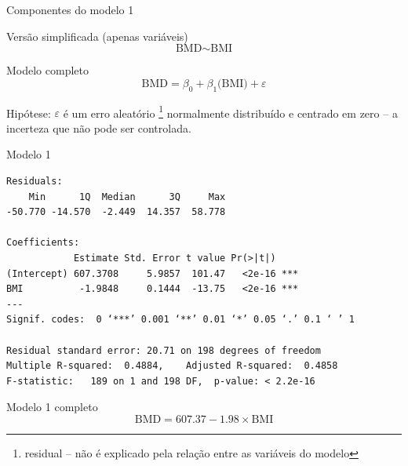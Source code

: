 \documentclass{beamer}
\begin{document}
\begin{frame}{\scriptsize Componentes do modelo 1}
  \begin{block}{\footnotesize Versão simplificada (apenas variáveis)}
    \footnotesize
    \begin{displaymath}
      \text{BMD} \sim \text{BMI}
    \end{displaymath}
  \end{block}
  \bigskip
  \bigskip
  \begin{block}{Modelo completo}
    \footnotesize
    \begin{displaymath}
      \text{BMD} =\beta_0 + \beta_1 \text{(BMI)} + \varepsilon
    \end{displaymath}
  \end{block}
  \vfill
  \footnotesize
  Hipótese: $\varepsilon$ é um erro aleatório \footnote{\scriptsize residual -- não é explicado pela relação entre as variáveis do modelo} normalmente distribuído e centrado em zero -- a incerteza que não pode ser controlada.
\end{frame}

\begin{frame}[fragile]{\scriptsize }
  \begin{center}
    \begin{exampleblock}{Modelo 1}
      \tiny
\begin{verbatim}
Residuals:
    Min      1Q  Median      3Q     Max 
-50.770 -14.570  -2.449  14.357  58.778 

Coefficients:
            Estimate Std. Error t value Pr(>|t|)    
(Intercept) 607.3708     5.9857  101.47   <2e-16 ***
BMI          -1.9848     0.1444  -13.75   <2e-16 ***
---
Signif. codes:  0 ‘***’ 0.001 ‘**’ 0.01 ‘*’ 0.05 ‘.’ 0.1 ‘ ’ 1

Residual standard error: 20.71 on 198 degrees of freedom
Multiple R-squared:  0.4884,	Adjusted R-squared:  0.4858 
F-statistic:   189 on 1 and 198 DF,  p-value: < 2.2e-16
\end{verbatim}
    \end{exampleblock}
  \begin{exampleblock}{Modelo 1 completo}
    \footnotesize
    \begin{displaymath}
      \text{BMD} =607.37 -1.98 \times\text{BMI}
    \end{displaymath}
  \end{exampleblock}
  \end{center}
\end{frame}
\end{document}
